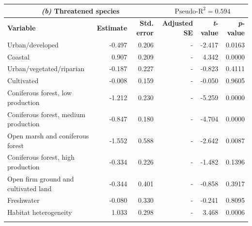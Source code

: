 \documentclass{article}
\begin{document}
\begin{table}[h]
\begin{tabular}{l r r r r r}
    \multicolumn{3}{c}{\textbf{\textit{(b)}  Threatened species}} & \multicolumn{3}{c}{$\text{Pseudo-R}^2 = 0.594$} \\
    \hline
    \textbf{Variable} & \textbf{Estimate} & \textbf{Std. error} & \textbf{Adjusted SE} & \textbf{\textit{t}-value} & \textbf{\textit{p}-value} \\
    \hline
    Urban/developed                         & -0.497   & 0.206     & -       & -2.417    & 0.0163    \\
    Coastal                                 & 0.907    & 0.209     & -       & 4.342    & 0.0000    \\
    Urban/vegetated/riparian                & -0.187   & 0.227     & -       & -0.823   & 0.4111    \\
    Cultivated                              & -0.008   & 0.159     & -       & -0.050   & 0.9605    \\
    Coniferous forest, low production       & -1.212   & 0.230     & -       & -5.259   & 0.0000    \\
    Coniferous forest, medium production    & -0.847   & 0.180     & -       & -4.704   & 0.0000    \\
    Open marsh and coniferous forest        & -1.552   & 0.588     & -       & -2.642   & 0.0087    \\
    Coniferous forest, high production      & -0.334   & 0.226     & -       & -1.482   & 0.1396    \\
    Open firm ground and cultivated land    & -0.344   & 0.401     & -       & -0.858   & 0.3917    \\
    Freshwater                              & -0.080   & 0.330     & -       & -0.241   & 0.8095    \\
    Habitat heterogeneity                   & 1.033    & 0.298     & -       & 3.468    & 0.0006    \\
    \hline
    & & & & & \\
    

\end{tabular}
\end{table}
\end{document}
